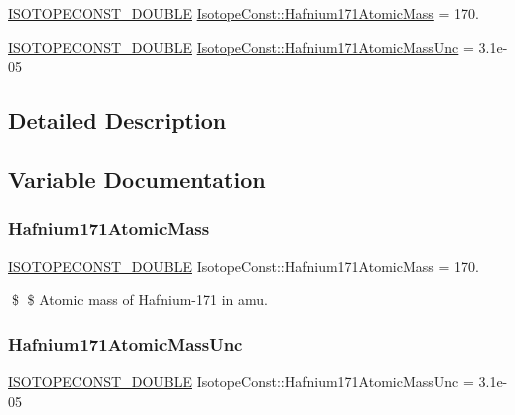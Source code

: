 \begin{DoxyCompactItemize}
\item 
\mbox{\hyperlink{group___isotope_const-_macros_ga8f45a7272ce02c0b4c65c44636ed719a}{I\+S\+O\+T\+O\+P\+E\+C\+O\+N\+S\+T\+\_\+\+D\+O\+U\+B\+LE}} \mbox{\hyperlink{group___isotope_const-_hafnium-_hf171_ga7fcdabab4733ac1c56fa0191a595593c}{Isotope\+Const\+::\+Hafnium171\+Atomic\+Mass}} = 170.
\item 
\mbox{\hyperlink{group___isotope_const-_macros_ga8f45a7272ce02c0b4c65c44636ed719a}{I\+S\+O\+T\+O\+P\+E\+C\+O\+N\+S\+T\+\_\+\+D\+O\+U\+B\+LE}} \mbox{\hyperlink{group___isotope_const-_hafnium-_hf171_ga6a42949be7f1a52a2ec2f1ec9900835d}{Isotope\+Const\+::\+Hafnium171\+Atomic\+Mass\+Unc}} = 3.\+1e-\/05
\end{DoxyCompactItemize}


\subsection{Detailed Description}


\subsection{Variable Documentation}
\mbox{\label{group___isotope_const-_hafnium-_hf171_ga7fcdabab4733ac1c56fa0191a595593c}} 
\subsubsection{\texorpdfstring{Hafnium171\+Atomic\+Mass}{Hafnium171AtomicMass}}
{\footnotesize\ttfamily \mbox{\hyperlink{group___isotope_const-_macros_ga8f45a7272ce02c0b4c65c44636ed719a}{I\+S\+O\+T\+O\+P\+E\+C\+O\+N\+S\+T\+\_\+\+D\+O\+U\+B\+LE}} Isotope\+Const\+::\+Hafnium171\+Atomic\+Mass = 170.}

\$ \$ Atomic mass of Hafnium-\/171 in amu. \mbox{\label{group___isotope_const-_hafnium-_hf171_ga6a42949be7f1a52a2ec2f1ec9900835d}} 
\subsubsection{\texorpdfstring{Hafnium171\+Atomic\+Mass\+Unc}{Hafnium171AtomicMassUnc}}
{\footnotesize\ttfamily \mbox{\hyperlink{group___isotope_const-_macros_ga8f45a7272ce02c0b4c65c44636ed719a}{I\+S\+O\+T\+O\+P\+E\+C\+O\+N\+S\+T\+\_\+\+D\+O\+U\+B\+LE}} Isotope\+Const\+::\+Hafnium171\+Atomic\+Mass\+Unc = 3.\+1e-\/05}

